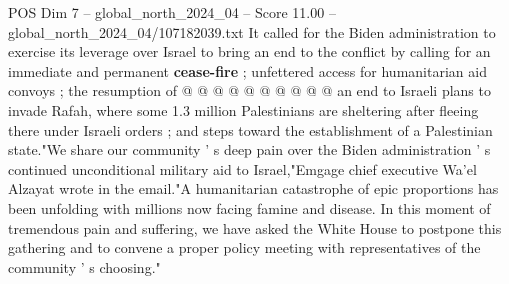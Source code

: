\begin{textsample}{POS Dim 7 – global\_north\_2024\_04 – Score 11.00 – global\_north\_2024\_04/107182039.txt}
It called for the Biden administration to exercise its leverage over Israel to bring an end to the conflict by calling for an immediate and permanent \textbf{cease-fire} ; unfettered access for humanitarian aid convoys ; the resumption of @ @ @ @ @ @ @ @ @ @ an end to Israeli plans to invade Rafah, where some 1.3 million Palestinians are sheltering after fleeing there under Israeli orders ; and steps toward the establishment of a Palestinian state."We share our community ' s deep pain over the Biden administration ' s continued unconditional military aid to Israel,"Emgage chief executive Wa'el Alzayat wrote in the email."A humanitarian catastrophe of epic proportions has been unfolding with millions now facing famine and disease.
In this moment of tremendous pain and suffering, we have asked the White House to postpone this gathering and to convene a proper policy meeting with representatives of the community ' s choosing."

\end{textsample}
